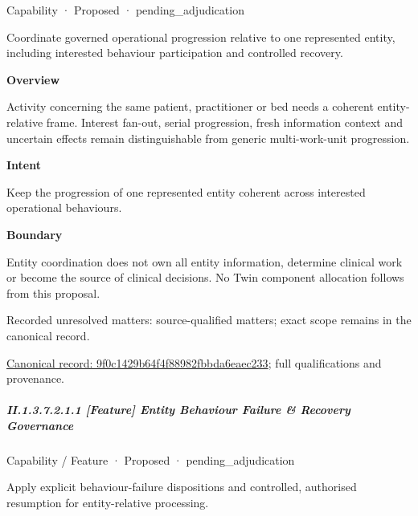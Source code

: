 \label{element:9f0c1429b64f4f88982fbbda6eaec233}
{\small Capability · Proposed · pending\_adjudication}\par

Coordinate governed operational progression relative to one represented entity, including interested behaviour participation and controlled recovery.



\textbf{Overview}



Activity concerning the same patient, practitioner or bed needs a coherent entity-relative frame. Interest fan-out, serial progression, fresh information context and uncertain effects remain distinguishable from generic multi-work-unit progression.



\textbf{Intent}



Keep the progression of one represented entity coherent across interested operational behaviours.



\textbf{Boundary}



Entity coordination does not own all entity information, determine clinical work or become the source of clinical decisions. No Twin component allocation follows from this proposal.


{\small Recorded unresolved matters: source-qualified matters; exact scope remains in the canonical record.}\par
{\footnotesize \href{../../../../../../../continuum/strategy/capability/9f0c1429b64f4f88982fbbda6eaec233.md}{Canonical record: 9f0c1429b64f4f88982fbbda6eaec233}; full qualifications and provenance.}\par
\subparagraph*{II.1.3.7.2.1.1 [Feature] Entity Behaviour Failure \& Recovery Governance}
\label{navigation:II.1.3.7.2.1.1}

\label{element:bdfaeebab74e4d4d96a5e3799a3aa07b}
{\small Capability / Feature · Proposed · pending\_adjudication}\par

Apply explicit behaviour-failure dispositions and controlled, authorised resumption for entity-relative processing.



